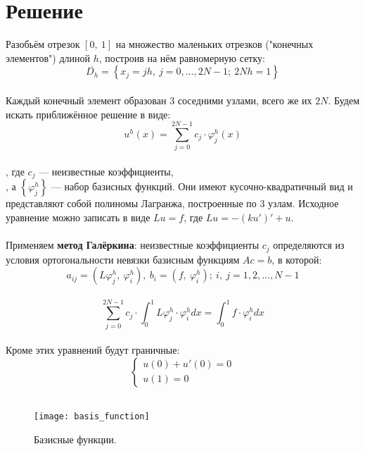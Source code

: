 \documentclass[12pt, a4paper]{article}
\begin{document}
	\section{Решение}
	\vspace{0.5cm}
	Разобьём отрезок $\left[0,\ 1\right]$ на множество маленьких отрезков
	("конечных элементов") длиной $h$, построив на нём равномерную сетку:\\
	\begin{equation}
		\overline{D_h} = \left\{ x_j = jh,\ j = 0, \ldots, 2N-1;\ 2Nh = 1 \right\}
	\end{equation}\\
	Каждый конечный элемент образован 3 соседними узлами, всего же их $2N$.
	Будем искать приближённое решение в виде:\\
	\begin{equation}
		u^{h}(x) = \sum\limits_{j = 0}^{2N-1} c_j \cdot \varphi_j^h(x)
	\end{equation}\\
	, где $c_j$ --- неизвестные коэффициенты,\\
	, а $\left\{\varphi_j^h\right\}$ --- набор базисных функций. 
	Они имеют кусочно-квадратичный вид и представляют собой полиномы Лагранжа, 
	построенные по 3 узлам. Исходное уравнение можно записать в виде 
	$Lu = f$, где $Lu = -(ku')' + u$.\\\\
	Применяем \textbf{метод Галёркина}: 
	неизвестные коэффициенты $c_j$ определяются из условия
	ортогональности невязки базисным функциям $Ac = b$, в которой:\\
	\begin{equation}
		a_{ij} = \left( L\varphi_j^h,\ \varphi_i^h \right),\
		b_i = \left( f,\ \varphi_i^h \right);\
		i,\ j = 1,2,\ldots,N-1
	\end{equation}\\
	\begin{equation}
		\sum\limits_{j = 0}^{2N-1} c_j 
		\cdot 
		\int_{0}^{1} L\varphi_j^h \cdot \varphi_i^h dx = 
		\int_{0}^{1} f \cdot \varphi_i^h dx
	\end{equation}\\
	Кроме этих уравнений будут граничные:
	\begin{equation}
		\begin{cases}
			u(0) + u'(0) = 0\\
			u(1) = 0
		\end{cases}
	\end{equation}\\
	\begin{figure}[t]
		\texttt{[image: basis\_function]}
		\caption{Базисные функции.}
		\label{ris:basis_function}
	\end{figure}
\end{document}
